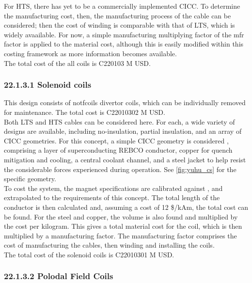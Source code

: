 For HTS, there has yet to be a commercially implemented CICC. To determine the manufacturing cost, then, the manufacturing process of the cable can be considered; then the cost of winding is comparable with that of LTS, which is widely avaailable. For now, a simple manufacturing multiplying factor of the mfr factor is applied to the material cost, although this is easily modified within this costing framework as more information becomes available.\\

The total cost of the all coils is C220103 M USD.


\subsubsection*{22.1.3.1 Solenoid coils}

This design consists of notfcoils divertor coils, which can be individually removed for maintenance. The total cost is C22010302 M USD.\\

Both LTS and HTS cables can be considered here. For each, a wide variety of designs are available, including no-insulation, partial insulation, and an array of CICC geometries. For this concept, a simple CICC geometry is considered \cite{Menard2016}, comprising a layer of superconducting REBCO conductor, copper for quench mitigation and cooling, a central coolant channel, and a steel jacket to help resist the considerable forces experienced during operation. See \ref{fig:yuhu_cs} for the specific geometry.\\

To cost the system, the magnet specifications are calibrated against \cite{Menard2016}, and extrapolated to the requirements of this concept. The total length of the conductor is then calculated and, assuming a cost of 12 \$/kAm, the total cost can be found. For the steel and copper, the volume is also found and multiplied by the cost per kilogram. This gives a total material cost for the coil, which is then multiplied by a manufacturing factor. The manufacturing factor comprises the cost of manufacturing the cables, then winding and installing the coils. \\

The total cost of the solenoid coils is C22010301 M USD.


\subsubsection*{22.1.3.2 Polodal Field Coils}

